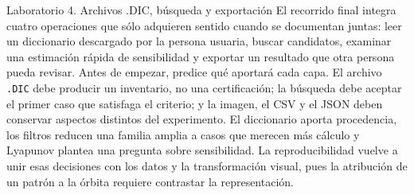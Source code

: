 \documentclass[11pt]{article}
\newcommand{\codigo}[1]{\texttt{#1}}
\begin{document}
\begin{laboratorio}{Laboratorio 4. Archivos .DIC, búsqueda y exportación}
El recorrido final integra cuatro operaciones que sólo adquieren sentido cuando se
documentan juntas: leer un diccionario descargado por la persona usuaria, buscar
candidatos, examinar una estimación rápida de sensibilidad y exportar un resultado que
otra persona pueda revisar. Antes de empezar, predice qué aportará cada capa. El archivo
\codigo{.DIC} debe producir un inventario, no una certificación; la búsqueda debe aceptar
el primer caso que satisfaga el criterio; y la imagen, el CSV y el JSON deben conservar
aspectos distintos del experimento. El diccionario aporta procedencia, los filtros
reducen una familia amplia a casos que merecen más cálculo y Lyapunov plantea una
pregunta sobre sensibilidad. La reproducibilidad vuelve a unir esas decisiones con los
datos y la transformación visual, pues la atribución de un patrón a la órbita requiere contrastar la representación.


\end{laboratorio}
\end{document}
